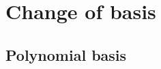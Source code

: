 \documentclass[modern]{aastex61}
\begin{document}
\pagebreak
\section{Change of basis}
\label{sec:basis}

\subsection{Polynomial basis}
\label{sec:polybasis}
\end{document}
